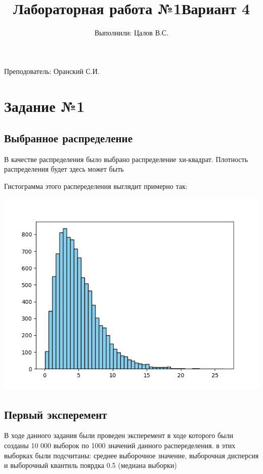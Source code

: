 \documentclass{article}
\title{Лабораторная работа №1}
\author{Выполнили: Цалов В.С.}
\begin{document}
\maketitle
Преподователь: Оранский С.И.

\title{Вариант 4}

\section{Задание №1}
\subsection{Выбранное распределение}

В качестве распределения было выбрано распределение хи-квадрат.
Плотность распределения будет здесь может быть

Гистограмма этого распеределения выглядит примерно так:

\begin{center}
      \centering
      \includegraphics[width=0.5\linewidth]{Python/chi.png}
\end{center}

\subsection{Первый эксперемент}
В ходе данного задания были проведен эксперемент в ходе которого были созданы 10 000 выборок по 1000 значений данного распеределения.
в этих выборках были подсчитаны: среднее выборочное значение, выборочная дисперсия и выборочный квантиль поярдка 0.5 (медиана выборки) 
\end{document}
